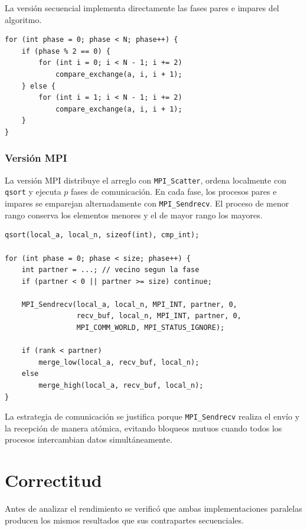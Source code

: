 \documentclass[12pt,a4paper]{article}
\begin{document}
La versión secuencial implementa directamente las fases pares e impares del algoritmo.

\begin{lstlisting}[caption=Fragmento de la versión secuencial]
for (int phase = 0; phase < N; phase++) {
    if (phase % 2 == 0) {
        for (int i = 0; i < N - 1; i += 2)
            compare_exchange(a, i, i + 1);
    } else {
        for (int i = 1; i < N - 1; i += 2)
            compare_exchange(a, i, i + 1);
    }
}
\end{lstlisting}

\subsubsection{Versión MPI}

La versión MPI distribuye el arreglo con \texttt{MPI\_Scatter}, ordena localmente con \texttt{qsort} y ejecuta $p$ fases de comunicación. En cada fase, los procesos pares e impares se emparejan alternadamente con \texttt{MPI\_Sendrecv}. El proceso de menor rango conserva los elementos menores y el de mayor rango los mayores.

\begin{lstlisting}[caption=Fragmento de la versión MPI]
qsort(local_a, local_n, sizeof(int), cmp_int);

for (int phase = 0; phase < size; phase++) {
    int partner = ...; // vecino segun la fase
    if (partner < 0 || partner >= size) continue;

    MPI_Sendrecv(local_a, local_n, MPI_INT, partner, 0,
                 recv_buf, local_n, MPI_INT, partner, 0,
                 MPI_COMM_WORLD, MPI_STATUS_IGNORE);

    if (rank < partner)
        merge_low(local_a, recv_buf, local_n);
    else
        merge_high(local_a, recv_buf, local_n);
}
\end{lstlisting}

La estrategia de comunicación se justifica porque \texttt{MPI\_Sendrecv} realiza el envío y la recepción de manera atómica, evitando bloqueos mutuos cuando todos los procesos intercambian datos simultáneamente.

\section{Correctitud}
\label{sec:correctitud}

Antes de analizar el rendimiento se verificó que ambas implementaciones paralelas producen los mismos resultados que sus contrapartes secuenciales.
\end{document}
